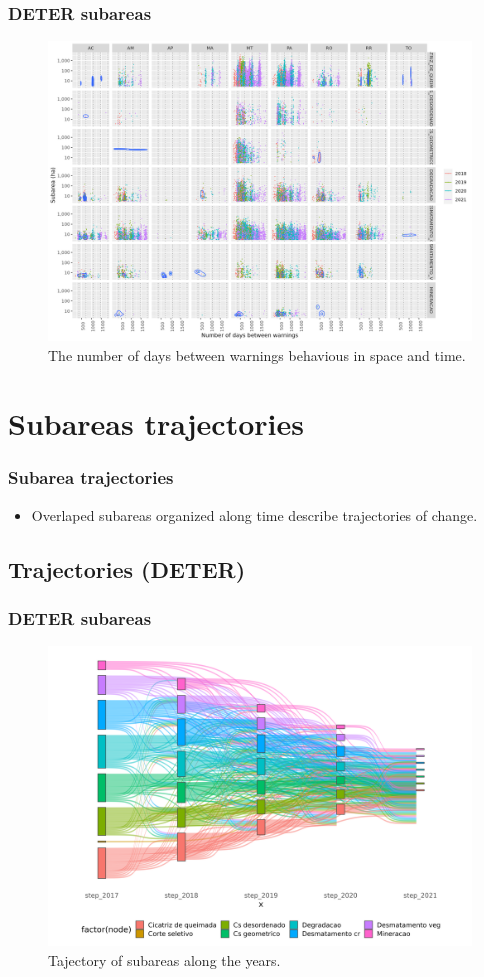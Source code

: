 \documentclass[aspectratio=169]{beamer}
\begin{document}
\begin{frame}
    \frametitle{DETER subareas}
    \begin{figure}[h] 
        \includegraphics[width=0.65\linewidth]
        {./figures/plot_deter_subarea_density_by_state_first-type_nwarnings.png}
        \caption{The number of days between warnings behavious in space and 
        time.}
        \label{fig:deter_subarea_density_state_first_type_nwarnings}
    \end{figure}
\end{frame}





\section{Subareas trajectories} 

\begin{frame}
    \frametitle{Subarea trajectories}
    \begin{itemize}
        \item Overlaped subareas organized along time describe trajectories of
            change.
    \end{itemize}
\end{frame}


\subsection{Trajectories (DETER)} 

\begin{frame}
    \frametitle{DETER subareas}
    \begin{figure}[h] 
        \includegraphics[width=0.65\linewidth]
        {./figures/plot_deter_subarea_trajectory_year.png}
        \caption{Tajectory of subareas along the years.}
        \label{fig:deter_subarea_trajectory_year}
    \end{figure}
\end{frame}
\end{document}
